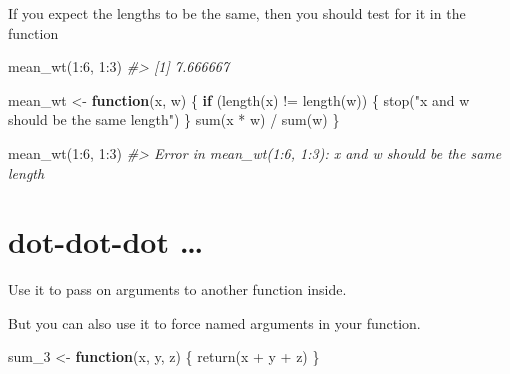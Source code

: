 \documentclass[
]{book}
\newenvironment{Shaded}{\begin{snugshade}}{\end{snugshade}}
\newcommand{\CommentTok}[1]{\textcolor[rgb]{0.56,0.35,0.01}{\textit{#1}}}
\newcommand{\ControlFlowTok}[1]{\textcolor[rgb]{0.13,0.29,0.53}{\textbf{#1}}}
\newcommand{\DecValTok}[1]{\textcolor[rgb]{0.00,0.00,0.81}{#1}}
\newcommand{\FunctionTok}[1]{\textcolor[rgb]{0.00,0.00,0.00}{#1}}
\newcommand{\NormalTok}[1]{#1}
\newcommand{\OtherTok}[1]{\textcolor[rgb]{0.56,0.35,0.01}{#1}}
\newcommand{\SpecialCharTok}[1]{\textcolor[rgb]{0.00,0.00,0.00}{#1}}
\newcommand{\StringTok}[1]{\textcolor[rgb]{0.31,0.60,0.02}{#1}}
\begin{document}
If you expect the lengths to be the same,
then you should test for it in the function

\begin{Shaded}
\begin{Highlighting}[]
\FunctionTok{mean\_wt}\NormalTok{(}\DecValTok{1}\SpecialCharTok{:}\DecValTok{6}\NormalTok{, }\DecValTok{1}\SpecialCharTok{:}\DecValTok{3}\NormalTok{)}
\CommentTok{\#\textgreater{} [1] 7.666667}
\end{Highlighting}
\end{Shaded}

\begin{Shaded}
\begin{Highlighting}[]
\NormalTok{mean\_wt }\OtherTok{\textless{}{-}} \ControlFlowTok{function}\NormalTok{(x, w) \{}
  \ControlFlowTok{if}\NormalTok{ (}\FunctionTok{length}\NormalTok{(x) }\SpecialCharTok{!=} \FunctionTok{length}\NormalTok{(w)) \{}
    \FunctionTok{stop}\NormalTok{(}\StringTok{"\textasciigrave{}x\textasciigrave{} and \textasciigrave{}w\textasciigrave{} should be the same length"}\NormalTok{)}
\NormalTok{  \}}
  \FunctionTok{sum}\NormalTok{(x }\SpecialCharTok{*}\NormalTok{ w) }\SpecialCharTok{/} \FunctionTok{sum}\NormalTok{(w)}
\NormalTok{\}}
\end{Highlighting}
\end{Shaded}

\begin{Shaded}
\begin{Highlighting}[]
\FunctionTok{mean\_wt}\NormalTok{(}\DecValTok{1}\SpecialCharTok{:}\DecValTok{6}\NormalTok{, }\DecValTok{1}\SpecialCharTok{:}\DecValTok{3}\NormalTok{)}
\CommentTok{\#\textgreater{} Error in mean\_wt(1:6, 1:3): \textasciigrave{}x\textasciigrave{} and \textasciigrave{}w\textasciigrave{} should be the same length}
\end{Highlighting}
\end{Shaded}

\hypertarget{dot-dot-dot}{%
\section{dot-dot-dot \ldots{}}\label{dot-dot-dot}}

Use it to pass on arguments to another function inside.

But you can also use it to force named arguments in your function.

\begin{Shaded}
\begin{Highlighting}[]
\NormalTok{sum\_3 }\OtherTok{\textless{}{-}} \ControlFlowTok{function}\NormalTok{(x, y, z) \{}
  \FunctionTok{return}\NormalTok{(x }\SpecialCharTok{+}\NormalTok{ y }\SpecialCharTok{+}\NormalTok{ z)}
\NormalTok{\}}
\end{Highlighting}
\end{Shaded}
\end{document}
